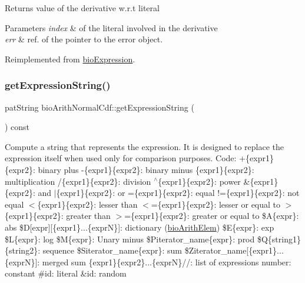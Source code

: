 \begin{DoxyReturn}{Returns}
value of the derivative w.\+r.\+t literal 
\end{DoxyReturn}

\begin{DoxyParams}{Parameters}
{\em index} & of the literal involved in the derivative \\
\hline
{\em err} & ref. of the pointer to the error object. \\
\hline
\end{DoxyParams}


Reimplemented from \hyperlink{classbio_expression_a5915579d1193f25f216c1e273c97f2ce}{bio\+Expression}.

\mbox{\label{classbio_arith_normal_cdf_a2e5b58ae0d8b71d2129e7f44ff9c647e}} 
\subsubsection{\texorpdfstring{get\+Expression\+String()}{getExpressionString()}}
{\footnotesize\ttfamily pat\+String bio\+Arith\+Normal\+Cdf\+::get\+Expression\+String (\begin{DoxyParamCaption}{ }\end{DoxyParamCaption}) const\hspace{0.3cm}{\ttfamily [virtual]}}

Compute a string that represents the expression. It is designed to replace the expression itself when used only for comparison purposes. Code\+: +\{expr1\}\{expr2\}\+: binary plus -\/\{expr1\}\{expr2\}\+: binary minus \{expr1\}\{expr2\}\+: multiplication /\{expr1\}\{expr2\}\+: division $^\wedge$\{expr1\}\{expr2\}\+: power \&\{expr1\}\{expr2\}\+: and $\vert$\{expr1\}\{expr2\}\+: or =\{expr1\}\{expr2\}\+: equal !=\{expr1\}\{expr2\}\+: not equal $<$\{expr1\}\{expr2\}\+: lesser than $<$=\{expr1\}\{expr2\}\+: lesser or equal to $>$\{expr1\}\{expr2\}\+: greater than $>$=\{expr1\}\{expr2\}\+: greater or equal to \$A\{expr\}\+: abs \$D\mbox{[}expr\mbox{]}\mbox{[}\{expr1\}...\{exprN\}\mbox{]}\+: dictionary (\hyperlink{classbio_arith_elem}{bio\+Arith\+Elem}) \$E\{expr\}\+: exp \$L\{expr\}\+: log \$M\{expr\}\+: Unary minus \$\+Piterator\+\_\+name\{expr\}\+: prod \$Q\{string1\}\{string2\}\+: sequence \$\+Siterator\+\_\+name\{expr\}\+: sum \$\+Ziterator\+\_\+name\mbox{[}\{expr1\}...\{exprN\}\mbox{]}\+: merged sum \{expr1\}\{expr2\}...\{exprN\}//\+: list of expressions number\+: constant \#id\+: literal \&id\+: random 

